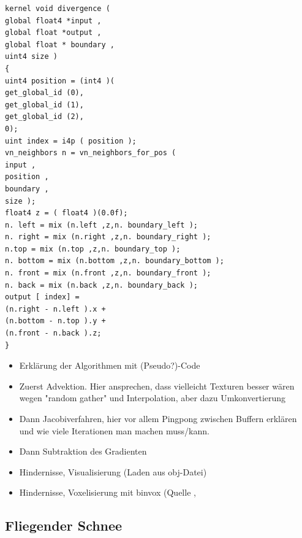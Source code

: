 \begin{lstlisting}
kernel void divergence (
global float4 *input ,
global float *output ,
global float * boundary ,
uint4 size )
{
uint4 position = (int4 )(
get_global_id (0),
get_global_id (1),
get_global_id (2),
0);
uint index = i4p ( position );
vn_neighbors n = vn_neighbors_for_pos (
input ,
position ,
boundary ,
size );
float4 z = ( float4 )(0.0f);
n. left = mix (n.left ,z,n. boundary_left );
n. right = mix (n.right ,z,n. boundary_right );
n.top = mix (n.top ,z,n. boundary_top );
n. bottom = mix (n.bottom ,z,n. boundary_bottom );
n. front = mix (n.front ,z,n. boundary_front );
n. back = mix (n.back ,z,n. boundary_back );
output [ index] =
(n.right - n.left ).x +
(n.bottom - n.top ).y +
(n.front - n.back ).z;
}
\end{lstlisting}

\begin{itemize}
\item Erklärung der Algorithmen mit (Pseudo?)-Code
\item Zuerst Advektion. Hier ansprechen, dass vielleicht Texturen besser wären
wegen "random gather" und Interpolation, aber dazu Umkonvertierung
\item Dann Jacobiverfahren, hier vor allem Pingpong zwischen Buffern erklären
und wie viele Iterationen man machen muss/kann.
\item Dann Subtraktion des Gradienten
\item Hindernisse, Visualisierung (Laden aus obj-Datei)
\item Hindernisse, Voxelisierung mit binvox (Quelle \cite{Nooruddin2003}, \cite{binvox2012}
\end{itemize}

\subsection{Fliegender Schnee}

